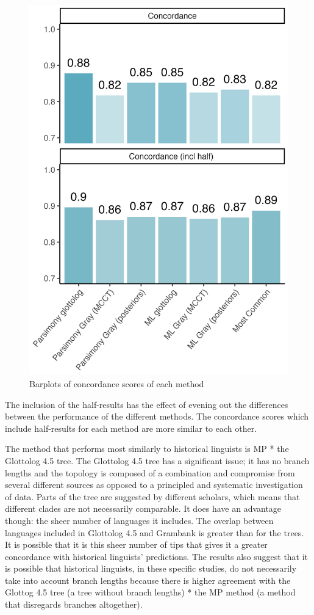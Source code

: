 \documentclass[12pt,letterpaper]{article}
\begin{document}
\begin{figure}[ht]
\centering
\includegraphics[width=12cm]{illustrations/plots_from_R/results/barplot_facet_scores_exclude_f1.png}
\caption{Barplots of concordance scores of each method}
\label{barplot_facet_results}
\end{figure}

The inclusion of the half-results has the effect of evening out the differences between the performance of the different methods. The concordance scores which include half-results for each method are more similar to each other.

The method that performs most similarly to historical linguists is MP * the Glottolog 4.5 tree. The Glottolog 4.5 tree has a significant issue; it has no branch lengths and the topology is composed of a combination and compromise from several different sources as opposed to a principled and systematic investigation of data. Parts of the tree are suggested by different scholars, which means that different clades are not necessarily comparable. It does have an advantage though: the sheer number of languages it includes. The overlap between languages included in Glottolog 4.5 and Grambank is greater than for the \citet{grayetal_2009} trees. It is possible that it is this sheer number of tips that gives it a greater concordance with historical linguists' predictions. The results also suggest that it is possible that historical linguists, in these specific studies, do not necessarily take into account branch lengths because there is higher agreement with the Glottog 4.5 tree (a tree without branch lengths) * the MP method (a method that disregards branches altogether).
\end{document}
